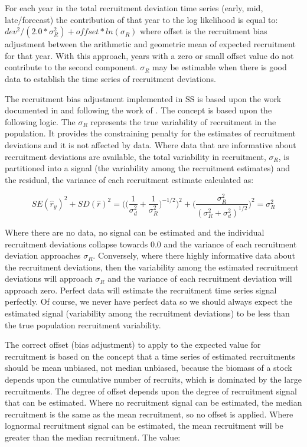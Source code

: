 \hypertarget{RecBias}{}
For each year in the total recruitment deviation time series (early, mid, late/forecast) the contribution of that year to the log likelihood is equal to:  $dev^2/(2.0*\sigma^2_R)+offset*ln(\sigma_R)$ where offset is the recruitment bias adjustment between the arithmetic and geometric mean of expected recruitment for that year.  With this approach, years with a zero or small offset value do not contribute to the second component. $\sigma_R$ may be estimable when there is good data to establish the time series of recruitment deviations.

The recruitment bias adjustment implemented in SS is based upon the work documented in \citet{methot-adjusting-2011} and following the work of \citet{maunder-estimation-2003}.  The concept is based upon the following logic.  The $\sigma_R$ represents the true variability of recruitment in the population.  It provides the constraining penalty for the estimates of recruitment deviations and it is not affected by data.  Where data that are informative about recruitment deviations are available, the total variability in recruitment, $\sigma_R$, is partitioned into a signal (the variability among the recruitment estimates) and the residual, the variance of each recruitment estimate calculated as:  

\begin{equation}
SE(\hat{r}_y)^2 + SD(\hat{r})^2=\Bigg( \bigg( \frac{1}{\sigma^2_d}+\frac{1}{\sigma^2_R}\bigg)^{-1/2}\Bigg)^2+\Bigg( \frac{\sigma^2_R}{(\sigma^2_R+\sigma^2_d)^{1/2}}\Bigg)^2=\sigma^2_R
\end{equation}

Where there are no data, no signal can be estimated and the individual recruitment deviations collapse towards 0.0 and the variance of each recruitment deviation approaches $\sigma_R$.  Conversely, where there highly informative data about the recruitment deviations, then the variability among the estimated recruitment deviations will approach $\sigma_R$ and the variance of each recruitment deviation will approach zero.  Perfect data will estimate the recruitment time series signal perfectly.  Of course, we never have perfect data so we should always expect the estimated signal (variability among the recruitment deviations) to be less than the true population recruitment variability.


The correct offset (bias adjustment) to apply to the expected value for recruitment is based on the concept that a time series of estimated recruitments should be mean unbiased, not median unbiased, because the biomass of a stock depends upon the cumulative number of recruits, which is dominated by the large recruitments.  The degree of offset depends upon the degree of recruitment signal that can be estimated.  Where no recruitment signal can be estimated, the median recruitment is the same as the mean recruitment, so no offset is applied.  Where lognormal recruitment signal can be estimated, the mean recruitment will be greater than the median recruitment.  The value:


